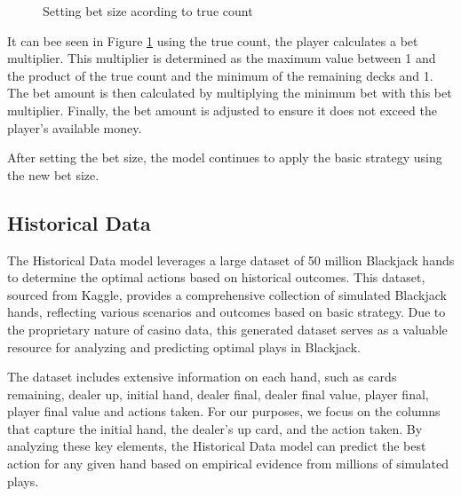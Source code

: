 \documentclass[a4paper,12pt]{report}
\begin{document}
\begin{figure}[H]
\caption{Setting bet size acording to true count}
\label{alg:calculate_betsize}
\end{figure}

It can bee seen in Figure \ref{alg:calculate_betsize} using the true count, the player calculates a bet multiplier. This multiplier is determined as the maximum value between 1 and the product of the true count and the minimum of the remaining decks and 1. The bet amount is then calculated by multiplying the minimum bet with this bet multiplier. Finally, the bet amount is adjusted to ensure it does not exceed the player's available money.

After setting the bet size, the model continues to apply the basic strategy using the new bet size.

\subsection{Historical Data}
The Historical Data model leverages a large dataset of 50 million Blackjack hands \cite{url:1} to determine the optimal actions based on historical outcomes. This dataset, sourced from Kaggle, provides a comprehensive collection of simulated Blackjack hands, reflecting various scenarios and outcomes based on basic strategy. Due to the proprietary nature of casino data, this generated dataset serves as a valuable resource for analyzing and predicting optimal plays in Blackjack.

The dataset includes extensive information on each hand, such as cards remaining, dealer up, initial hand, dealer final, dealer final value, player final, player final value and actions taken. For our purposes, we focus on the columns that capture the initial hand, the dealer's up card, and the action taken. By analyzing these key elements, the Historical Data model can predict the best action for any given hand based on empirical evidence from millions of simulated plays.
\end{document}
